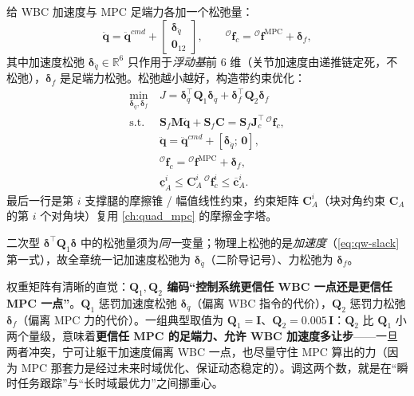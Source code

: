 给 WBC 加速度与 MPC 足端力各加一个松弛量\cite{yu2021quadruped}：
\begin{equation}
  \ddot{\boldsymbol{q}}=\ddot{\boldsymbol{q}}^{cmd}+\begin{bmatrix}\boldsymbol{\delta}_{\ddot{q}}\\\mathbf{0}_{12}\end{bmatrix},
  \qquad
  {}^{\mathcal{O}}\boldsymbol{f}_c={}^{\mathcal{O}}\boldsymbol{f}^{\mathrm{MPC}}+\boldsymbol{\delta}_f,
  \label{eq:qw-slack}
\end{equation}
其中加速度松弛 $\boldsymbol{\delta}_{\ddot{q}}\in\mathbb{R}^6$ 只作用于\emph{浮动基}前 $6$ 维（关节加速度由递推链定死，不松弛），$\boldsymbol{\delta}_f$ 是足端力松弛。松弛越小越好，构造带约束优化\cite{yu2021quadruped}：
\begin{equation}
\begin{aligned}
\min_{\boldsymbol{\delta}_{\ddot{q}},\boldsymbol{\delta}_f}\ & J=\boldsymbol{\delta}_{\ddot{q}}^\top\boldsymbol{Q}_1\boldsymbol{\delta}_{\ddot{q}}+\boldsymbol{\delta}_f^\top\boldsymbol{Q}_2\boldsymbol{\delta}_f\\
\text{s.t.}\ & \boldsymbol{S}_f\boldsymbol{M}\ddot{\boldsymbol{q}}+\boldsymbol{S}_f\boldsymbol{C}=\boldsymbol{S}_f\boldsymbol{J}_c^\top\,{}^{\mathcal{O}}\boldsymbol{f}_c,\\
& \ddot{\boldsymbol{q}}=\ddot{\boldsymbol{q}}^{cmd}+[\boldsymbol{\delta}_{\ddot{q}};\,\mathbf{0}],\\
& {}^{\mathcal{O}}\boldsymbol{f}_c={}^{\mathcal{O}}\boldsymbol{f}^{\mathrm{MPC}}+\boldsymbol{\delta}_f,\\
& \underline{\boldsymbol{c}}_A^i\le\boldsymbol{C}_A^i\,{}^{\mathcal{O}}\boldsymbol{f}_c^i\le\overline{\boldsymbol{c}}_A^i.
\end{aligned}
\label{eq:qw-slack-opt}
\end{equation}
最后一行是第 $i$ 支撑腿的摩擦锥 / 幅值线性约束，约束矩阵 $\boldsymbol{C}_A^i$（块对角约束 $\boldsymbol{C}_A$ 的第 $i$ 个对角块）复用 \cref{ch:quad_mpc} 的摩擦金字塔。

二次型 $\boldsymbol{\delta}^\top\boldsymbol{Q}_1\boldsymbol{\delta}$ 中的松弛量须为\emph{同一}变量；物理上松弛的是\emph{加速度}（\cref{eq:qw-slack} 第一式），故全章统一记加速度松弛为 $\boldsymbol{\delta}_{\ddot{q}}$（二阶导记号）、力松弛为 $\boldsymbol{\delta}_f$。

\begin{insight}\label{ins:qw-Q1Q2}
权重矩阵有清晰的直觉：\textbf{$\boldsymbol{Q}_1,\boldsymbol{Q}_2$ 编码“控制系统更信任 WBC 一点还是更信任 MPC 一点”}。$\boldsymbol{Q}_1$ 惩罚加速度松弛 $\boldsymbol{\delta}_{\ddot{q}}$（偏离 WBC 指令的代价），$\boldsymbol{Q}_2$ 惩罚力松弛 $\boldsymbol{\delta}_f$（偏离 MPC 力的代价）。一组典型取值为 $\boldsymbol{Q}_1=\mathbf{I}$、$\boldsymbol{Q}_2=0.005\,\mathbf{I}$：$\boldsymbol{Q}_2$ 比 $\boldsymbol{Q}_1$ 小两个量级，意味着\textbf{更信任 MPC 的足端力、允许 WBC 加速度多让步}——一旦两者冲突，宁可让躯干加速度偏离 WBC 一点，也尽量守住 MPC 算出的力（因为 MPC 那套力是经过未来时域优化、保证动态稳定的）。调这两个数，就是在“瞬时任务跟踪”与“长时域最优力”之间挪重心。
\end{insight}

